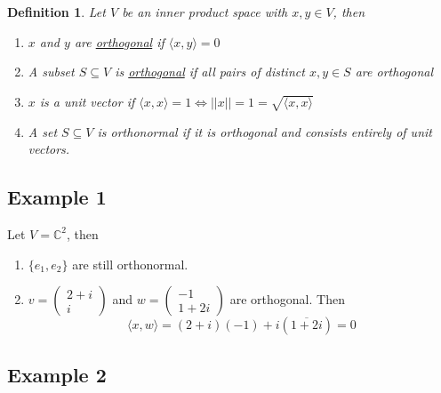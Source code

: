 \documentclass{article}
\newtheorem{definition}[theorem]{Definition}
\newtheorem{one minute paper}[theorem]{One Minute Paper}
\begin{document}
\begin{definition}
    Let $V$ be an inner product space with $x,y \in V$, then 
    \begin{enumerate}
        \item $x$ and $y$ are \underline{orthogonal} if $\langle x,y \rangle = 0$
        \item A subset $S \subseteq V$ is \underline{orthogonal} if all pairs of distinct $x,y \in S$ are orthogonal
        \item $x$ is a unit vector if $\langle x,x \rangle = 1 \iff ||x|| = 1 = \sqrt{\langle x,x \rangle}$
        \item A set $S \subseteq V$ is orthonormal if it is orthogonal and consists entirely of unit vectors. 
    \end{enumerate}
\end{definition}

\subsection*{Example 1}
Let $V = \mathbb{C}^2$, then 
\begin{enumerate}
    \item $\{e_1,e_2\}$ are still orthonormal. 
    \item $v = \begin{pmatrix}
        2 + i \\
        i
    \end{pmatrix}$ and $w = \begin{pmatrix}
        -1 \\
        1 + 2i
    \end{pmatrix}$ are orthogonal. Then 
    \begin{equation}
        \langle x,w\rangle = (2 + i)(-1) + i(\overline{1+2i}) = 0
    \end{equation}
\end{enumerate}

\subsection*{Example 2}
\end{document}
